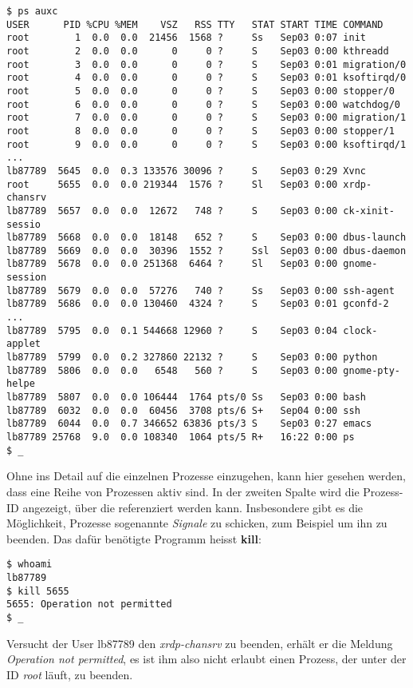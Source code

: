 \documentclass[titlepage,a4paper]{article}
\begin{document}
\begin{verbatim}
$ ps auxc
USER      PID %CPU %MEM    VSZ   RSS TTY   STAT START TIME COMMAND
root        1  0.0  0.0  21456  1568 ?     Ss   Sep03 0:07 init
root        2  0.0  0.0      0     0 ?     S    Sep03 0:00 kthreadd
root        3  0.0  0.0      0     0 ?     S    Sep03 0:01 migration/0
root        4  0.0  0.0      0     0 ?     S    Sep03 0:01 ksoftirqd/0
root        5  0.0  0.0      0     0 ?     S    Sep03 0:00 stopper/0
root        6  0.0  0.0      0     0 ?     S    Sep03 0:00 watchdog/0
root        7  0.0  0.0      0     0 ?     S    Sep03 0:00 migration/1
root        8  0.0  0.0      0     0 ?     S    Sep03 0:00 stopper/1
root        9  0.0  0.0      0     0 ?     S    Sep03 0:00 ksoftirqd/1
...
lb87789  5645  0.0  0.3 133576 30096 ?     S    Sep03 0:29 Xvnc
root     5655  0.0  0.0 219344  1576 ?     Sl   Sep03 0:00 xrdp-chansrv
lb87789  5657  0.0  0.0  12672   748 ?     S    Sep03 0:00 ck-xinit-sessio
lb87789  5668  0.0  0.0  18148   652 ?     S    Sep03 0:00 dbus-launch
lb87789  5669  0.0  0.0  30396  1552 ?     Ssl  Sep03 0:00 dbus-daemon
lb87789  5678  0.0  0.0 251368  6464 ?     Sl   Sep03 0:00 gnome-session
lb87789  5679  0.0  0.0  57276   740 ?     Ss   Sep03 0:00 ssh-agent
lb87789  5686  0.0  0.0 130460  4324 ?     S    Sep03 0:01 gconfd-2
...
lb87789  5795  0.0  0.1 544668 12960 ?     S    Sep03 0:04 clock-applet
lb87789  5799  0.0  0.2 327860 22132 ?     S    Sep03 0:00 python
lb87789  5806  0.0  0.0   6548   560 ?     S    Sep03 0:00 gnome-pty-helpe
lb87789  5807  0.0  0.0 106444  1764 pts/0 Ss   Sep03 0:00 bash
lb87789  6032  0.0  0.0  60456  3708 pts/6 S+   Sep04 0:00 ssh
lb87789  6044  0.0  0.7 346652 63836 pts/3 S    Sep03 0:27 emacs
lb87789 25768  9.0  0.0 108340  1064 pts/5 R+   16:22 0:00 ps
$ _
\end{verbatim}

Ohne ins Detail auf die einzelnen Prozesse einzugehen, kann hier gesehen
werden, dass eine Reihe von Prozessen aktiv sind.  In der zweiten Spalte wird die Prozess-ID
angezeigt, über die referenziert werden kann.  Insbesondere gibt es die
Möglichkeit, Prozesse sogenannte \emph{Signale} zu schicken, zum Beispiel um
ihn zu beenden.  Das dafür benötigte Programm heisst \textbf{kill}:

\begin{verbatim}
$ whoami
lb87789
$ kill 5655
5655: Operation not permitted
$ _
\end{verbatim}

Versucht der User lb87789 den \emph{xrdp-chansrv} zu beenden, erhält er die Meldung
\emph{Operation not permitted}, es ist ihm also nicht erlaubt einen Prozess,
der unter der ID \emph{root} läuft, zu beenden.
\end{document}

